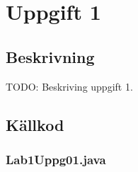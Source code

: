 \section{Uppgift 1}\label{uppgift-1}

\subsection{Beskrivning}
TODO: Beskriving uppgift 1.

\subsection{Källkod}\label{subsection-1}
\subsubsection*{Lab1Uppg01.java}
\inputminted[]{java}{../src/Lab1Uppg01.java}
